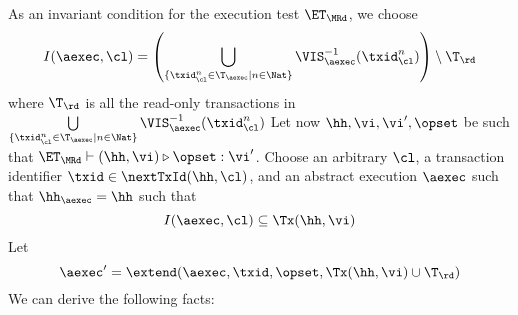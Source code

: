 As an invariant condition for the execution test $\ET_{\MRd}$, we choose 
\[
    I(\aexec, \cl) = \left( \bigcup_{\{\txid_{\cl}^{n} \in \T_{\aexec} \mid n \in \Nat\}} \VIS_{\aexec}^{-1}(\txid^n_\cl) \right) \setminus \T_\rd
\]
where \( \T_\rd \) is all the read-only transactions in \( \bigcup\limits_{\{\txid_{\cl}^{n} \in \T_{\aexec} \mid n \in \Nat\}} \VIS_{\aexec}^{-1}(\txid^n_\cl) \) 
Let now $\hh, \vi, \vi', \opset$ be such that $\ET_{\MRd} \vdash (\hh, \vi) \triangleright \opset: \vi'$. 
Choose an arbitrary $\cl$, a transaction identifier $\txid \in \nextTxId(\hh, \cl)$, 
and an abstract execution $\aexec$ such that $\hh_{\aexec} = \hh$ such that 
\begin{equation}
I(\aexec, \cl) \subseteq \Tx(\hh, \vi)
\label{eq:mr_invariant}
\end{equation}
Let 
\[ 
\aexec' = \extend(\aexec, \txid, \opset, \Tx(\hh, \vi) \cup \T_\rd) 
\]
We can derive the following facts:
